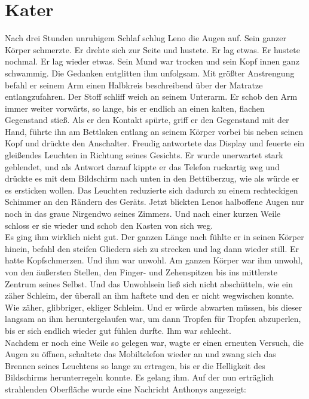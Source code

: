\documentclass[ngerman,smalldemyvopaper,11pt,oneside,onecolumn,openright,extrafontsizes]{memoir}
\begin{document}
\chapter{Kater}
Nach drei Stunden unruhigem Schlaf schlug Leno die Augen auf. Sein ganzer Körper schmerzte. Er drehte sich zur Seite und hustete. Er lag etwas. Er hustete nochmal. Er lag wieder etwas. Sein Mund war trocken und sein Kopf innen ganz schwammig. Die Gedanken entglitten ihm unfolgsam. Mit größter Anstrengung befahl er seinem Arm einen Halbkreis beschreibend über der Matratze entlangzufahren. Der Stoff schliff weich an seinem Unterarm. Er schob den Arm immer weiter vorwärts, so lange, bis er endlich an einen kalten, flachen Gegenstand stieß. Als er den Kontakt spürte, griff er den Gegenstand mit der Hand, führte ihn am Bettlaken entlang an seinem Körper vorbei bis neben seinen Kopf und drückte den Anschalter. Freudig antwortete das Display und feuerte ein gleißendes Leuchten in Richtung seines Gesichts. Er wurde unerwartet stark geblendet, und als Antwort darauf kippte er das Telefon ruckartig weg und drückte es mit dem Bildschirm nach unten in den Bettüberzug, wie als würde er es ersticken wollen. Das Leuchten reduzierte sich dadurch zu einem rechteckigen Schimmer an den Rändern des Geräts. Jetzt blickten Lenos halboffene Augen nur noch in das graue Nirgendwo seines Zimmers. Und nach einer kurzen Weile schloss er sie wieder und schob den Kasten von sich weg.\\
Es ging ihm wirklich nicht gut. Der ganzen Länge nach fühlte er in seinen Körper hinein, befahl den steifen Gliedern sich zu strecken und lag dann wieder still. Er hatte Kopfschmerzen. Und ihm war unwohl. Am ganzen Körper war ihm unwohl, von den äußersten Stellen, den Finger- und Zehenspitzen bis ins mittlerste Zentrum seines Selbst. Und das Unwohlsein ließ sich nicht abschütteln, wie ein zäher Schleim, der überall an ihm haftete und den er nicht wegwischen konnte. Wie zäher, glibbriger, ekliger Schleim. Und er würde abwarten müssen, bis dieser langsam an ihm heruntergelaufen war, um dann Tropfen für Tropfen abzuperlen, bis er sich endlich wieder gut fühlen durfte. Ihm war schlecht.\\
Nachdem er noch eine Weile so gelegen war, wagte er einen erneuten Versuch, die Augen zu öffnen, schaltete das Mobiltelefon wieder an und zwang sich das Brennen seines Leuchtens so lange zu ertragen, bis er die Helligkeit des Bildschirms herunterregeln konnte. Es gelang ihm. Auf der nun erträglich strahlenden Oberfläche wurde eine Nachricht Anthonys angezeigt:\\
\end{document}
